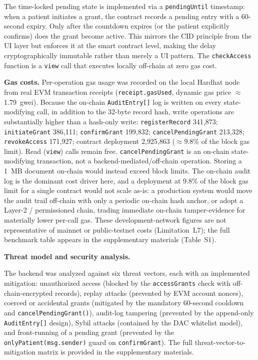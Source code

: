 \documentclass[journal,onecolumn]{IEEEtran}
\begin{document}
The time-locked pending state is implemented via a \texttt{pendingUntil} timestamp: when a patient initiates a grant, the contract records a pending entry with a 60-second expiry. Only after the countdown expires (or the patient explicitly confirms) does the grant become active. This mirrors the CID principle from the UI layer but enforces it at the smart contract level, making the delay cryptographically immutable rather than merely a UI pattern. The \texttt{checkAccess} function is a \texttt{view} call that executes locally off-chain at zero gas cost.

\noindent\textbf{Gas costs.} Per-operation gas usage was recorded on the local Hardhat node from real EVM transaction receipts (\texttt{receipt.gasUsed}, dynamic gas price $\approx$1.79~gwei). Because the on-chain \texttt{AuditEntry[]} log is written on every state-modifying call, in addition to the 32-byte record hash, write operations are substantially higher than a hash-only write: \texttt{registerRecord} 341{,}873; \texttt{initiateGrant} 386{,}111; \texttt{confirmGrant} 199{,}832; \texttt{cancelPendingGrant} 213{,}328; \texttt{revokeAccess} 171{,}927; contract deployment 2{,}925{,}863 ($\approx$9.8\% of the block gas limit). Read (\texttt{view}) calls remain free. \texttt{cancelPendingGrant} is an on-chain state-modifying transaction, not a backend-mediated/off-chain operation. Storing a 1~MB document on-chain would instead exceed block limits. The on-chain audit log is the dominant cost driver here, and a deployment at 9.8\% of the block gas limit for a single contract would not scale as-is: a production system would move the audit trail off-chain with only a periodic on-chain hash anchor, or adopt a Layer-2 / permissioned chain, trading immediate on-chain tamper-evidence for materially lower per-call gas. These development-network figures are not representative of mainnet or public-testnet costs (Limitation~L7); the full benchmark table appears in the supplementary materials (Table~S1).

\noindent\textbf{Threat model and security analysis.}

The backend was analyzed against six threat vectors, each with an implemented mitigation: unauthorized access (blocked by the \texttt{accessGrants} check with off-chain-encrypted records), replay attacks (prevented by EVM account nonces), coerced or accidental grants (mitigated by the mandatory 60-second cooldown and \texttt{cancelPendingGrant()}), audit-log tampering (prevented by the append-only \texttt{AuditEntry[]} design), Sybil attacks (contained by the DAC whitelist model), and front-running of a pending grant (prevented by the \texttt{onlyPatient(msg.sender)} guard on \texttt{confirmGrant}). The full threat-vector-to-mitigation matrix is provided in the supplementary materials.
\end{document}
